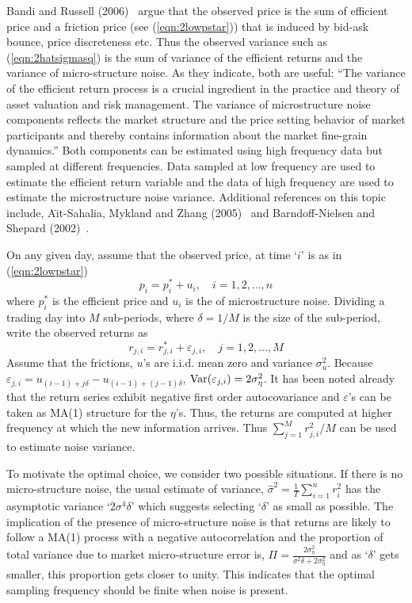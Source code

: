 Bandi and Russell (2006)~\cite{bandi} argue that the observed price is the sum of efficient price and a friction price (see (\ref{eqn:2lowpstar})) that is induced by bid-ask bounce, price discreteness etc. Thus the observed variance such as (\ref{eqn:2hatsigmasq}) is the sum of variance of the efficient returns and the variance of micro-structure noise. As they indicate, both are useful: ``The variance of the efficient return process is a crucial ingredient in the practice and theory of asset valuation and risk management. The variance of microstructure noise components reflects the market structure and the price setting behavior of market participants and thereby contains information about the market fine-grain dynamics.'' Both components can be estimated using high frequency data but sampled at different frequencies. Data sampled at low frequency are used to estimate the efficient return variable and the data of high frequency are used to estimate the microstructure noise variance. Additional references on this topic include, A{\"\i}t-Sahalia, Mykland and Zhang (2005)~\cite{ait2005often} and Barndoff-Nielsen and Shepard (2002)~\cite{barndorff2002econometric}.


On any given day, assume that the observed price, at time `$i$' is as in (\ref{eqn:2lowpstar})
	\begin{equation}\label{eqn:2pi2}
	p_i = p_i^* + u_i, \quad i= 1,2,\ldots,n
	\end{equation}
where $p_i^*$ is the efficient price and $u_i$ is the of microstructure noise. Dividing a trading day into $M$ sub-periods, where $\delta= 1/M$ is the size of the sub-period, write the observed returns as
	\begin{equation}\label{eqn:2rji2}
	r_{j,i} = r_{j,i}^* + \varepsilon_{j,i}, \quad j= 1,2,\ldots,M
	\end{equation}
Assume that the frictions, $u$'s are i.i.d. mean zero and variance $\sigma_{u}^2$. Because $\varepsilon_{j,i}= u_{(i-1)+j\delta} - u_{(i-1) + (j-1)\delta}$, $\operatorname{Var}(\varepsilon_{j,i})= 2\sigma_{\eta}^2$. It has been noted already that the return series exhibit negative first order autocovariance and $\varepsilon$'s can be taken as MA(1) structure for the $\eta$'s. Thus, the returns are computed at higher frequency at which the new information arrives. Thus $\sum_{j=1}^M r_{j,i}^2/M$ can be used to estimate noise variance. 


To motivate the optimal choice, we consider two possible situations. If there is no micro-structure noise, the usual estimate of variance, $\hat{\sigma}^2= \frac{1}{T} \sum_{i=1}^n r_i^2$ has the asymptotic variance `$2\sigma^4\delta$' which suggests selecting `$\delta$' as small as possible. The implication of the presence of micro-structure noise is that returns are likely to follow a MA(1) process with a negative autocorrelation and the proportion of total variance due to market micro-structure error is, $\Pi= \frac{2\sigma_\eta^2}{\sigma^2\delta+2\sigma_\eta^2}$ and as `$\delta$' gets smaller, this proportion gets closer to unity. This indicates that the optimal sampling frequency should be finite when noise is present.



